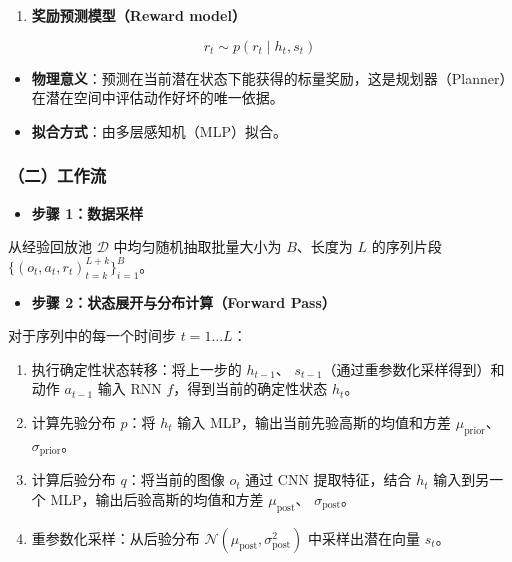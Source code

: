 \begin{enumerate}
\def\labelenumi{\arabic{enumi}.}
\setcounter{enumi}{4}
\tightlist
\item
  \textbf{奖励预测模型（Reward model）}
\end{enumerate}

\[
r_t \sim p(r_t \mid h_t, s_t)
\]

\begin{itemize}
\tightlist
\item
  \textbf{物理意义}：预测在当前潜在状态下能获得的标量奖励，这是规划器（Planner）在潜在空间中评估动作好坏的唯一依据。
\item
  \textbf{拟合方式}：由多层感知机（MLP）拟合。
\end{itemize}

\hypertarget{ux4e8cux5de5ux4f5cux6d41-5}{%
\subsubsection{（二）工作流}\label{ux4e8cux5de5ux4f5cux6d41-5}}

\begin{itemize}
\tightlist
\item
  \textbf{步骤 1：数据采样}
\end{itemize}

从经验回放池 \(\mathcal{D}\) 中均匀随机抽取批量大小为 \(B\)、长度为 \(L\) 的序列片段 \(\lbrace(o_t, a_t, r_t)_{t=k}^{L+k}\rbrace_{i=1}^{B}\)。

\begin{itemize}
\tightlist
\item
  \textbf{步骤 2：状态展开与分布计算（Forward Pass）}
\end{itemize}

对于序列中的每一个时间步 \(t = 1 \ldots L\)：

\begin{enumerate}
\def\labelenumi{\arabic{enumi}.}
\tightlist
\item
  执行确定性状态转移：将上一步的 \(h_{t-1}\)、 \(s_{t-1}\)（通过重参数化采样得到）和动作 \(a_{t-1}\) 输入 RNN \(f\)，得到当前的确定性状态 \(h_t\)。
\item
  计算先验分布 \(p\)：将 \(h_t\) 输入 MLP，输出当前先验高斯的均值和方差 \(\mu_{\mathrm{prior}}\)、 \(\sigma_{\mathrm{prior}}\)。
\item
  计算后验分布 \(q\)：将当前的图像 \(o_t\) 通过 CNN 提取特征，结合 \(h_t\) 输入到另一个 MLP，输出后验高斯的均值和方差 \(\mu_{\mathrm{post}}\)、 \(\sigma_{\mathrm{post}}\)。
\item
  重参数化采样：从后验分布 \(\mathcal{N}(\mu_{\mathrm{post}}, \sigma_{\mathrm{post}}^2)\) 中采样出潜在向量 \(s_t\)。
\end{enumerate}

